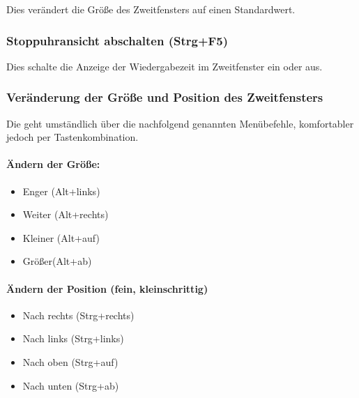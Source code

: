 \documentclass[a4paper,DIV=11
]{scrartcl}
\begin{document}
Dies verändert die Größe des Zweitfensters auf einen Standardwert.

\hypertarget{stoppuhransicht-abschalten-strgf5}{%
\subsubsection{Stoppuhransicht abschalten
(Strg+F5)}\label{stoppuhransicht-abschalten-strgf5}}

Dies schalte die Anzeige der Wiedergabezeit im Zweitfenster ein oder
aus.

\hypertarget{veruxe4nderung-der-gruxf6uxdfe-und-position-des-zweitfensters}{%
\subsubsection{Veränderung der Größe und Position des
Zweitfensters}\label{veruxe4nderung-der-gruxf6uxdfe-und-position-des-zweitfensters}}

Die geht umständlich über die nachfolgend genannten Menübefehle,
komfortabler jedoch per Tastenkombination.

\hypertarget{uxe4ndern-der-gruxf6uxdfe}{%
\paragraph{Ändern der Größe:}\label{uxe4ndern-der-gruxf6uxdfe}}

\begin{itemize}
\item
  Enger (Alt+links)
\item
  Weiter (Alt+rechts)
\item
  Kleiner (Alt+auf)
\item
  Größer(Alt+ab)
\end{itemize}

\hypertarget{uxe4ndern-der-position-fein-kleinschrittig}{%
\paragraph{Ändern der Position (fein,
kleinschrittig)}\label{uxe4ndern-der-position-fein-kleinschrittig}}

\begin{itemize}
\item
  Nach rechts (Strg+rechts)
\item
  Nach links (Strg+links)
\item
  Nach oben (Strg+auf)
\item
  Nach unten (Strg+ab)
\end{itemize}
\end{document}
